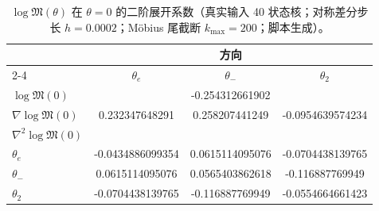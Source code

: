 \begin{table}[H]
\centering
\scriptsize
\setlength{\tabcolsep}{8pt}
\renewcommand{\arraystretch}{1.2}
\caption{$\log\mathfrak{M}(\theta)$ 在 $\theta=0$ 的二阶展开系数（真实输入 40 状态核；对称差分步长 $h=0.0002$；Möbius 尾截断 $k_{\max}=200$；脚本生成）。}
\label{tab:real-input-40-logM-theta-taylor}
\begin{tabular}{@{}lccc@{}}
\toprule
 & \multicolumn{3}{c}{方向} \\
\cmidrule(lr){2-4}
 & $\theta_e$ & $\theta_-$ & $\theta_2$ \\
\midrule
$\log\mathfrak{M}(0)$ & \multicolumn{3}{c}{-0.254312661902} \\
\midrule
$\nabla\log\mathfrak{M}(0)$ & 0.232347648291 & 0.258207441249 & -0.0954639574234 \\
\midrule
$\nabla^2\log\mathfrak{M}(0)$ &  &  &  \\
$\theta_e$ & -0.0434886099354 & 0.0615114095076 & -0.0704438139765 \\
$\theta_-$ & 0.0615114095076 & 0.0565403862618 & -0.116887769949 \\
$\theta_2$ & -0.0704438139765 & -0.116887769949 & -0.0554664661423 \\
\bottomrule
\end{tabular}
\end{table}
